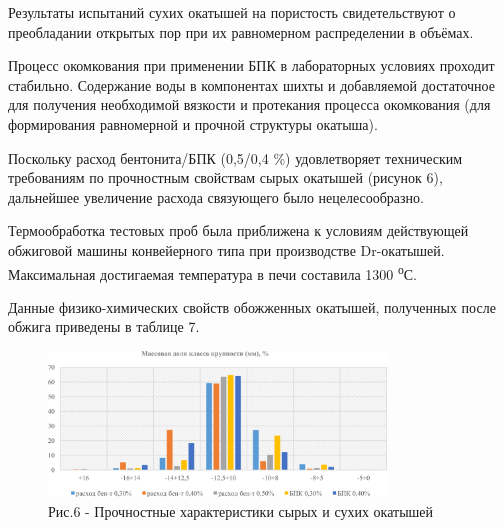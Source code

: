 \begin{multicols}{2}
Результаты испытаний сухих окатышей на пористость свидетельствуют о
преобладании открытых пор при их равномерном распределении в объёмах.

Процесс окомкования при применении БПК в лабораторных условиях проходит
стабильно. Содержание воды в компонентах шихты и добавляемой достаточное
для получения необходимой вязкости и протекания процесса окомкования
(для формирования равномерной и прочной структуры окатыша).

Поскольку расход бентонита/БПК (0,5/0,4 \%) удовлетворяет техническим
требованиям по прочностным свойствам сырых окатышей (рисунок 6),
дальнейшее увеличение расхода связующего было нецелесообразно.

Термообработка тестовых проб была приближена к условиям действующей
обжиговой машины конвейерного типа при производстве Dr-окатышей.
Максимальная достигаемая температура в печи составила 1300
\textsuperscript{о}С.

Данные физико-химических свойств обожженных окатышей, полученных после
обжига приведены в таблице 7.
\end{multicols}

\begin{figure}[H]
	\centering
	\includegraphics[width=0.8\textwidth]{media/chem4/image7}
	\caption*{Рис.6 - Прочностные характеристики сырых и сухих окатышей}
\end{figure}

